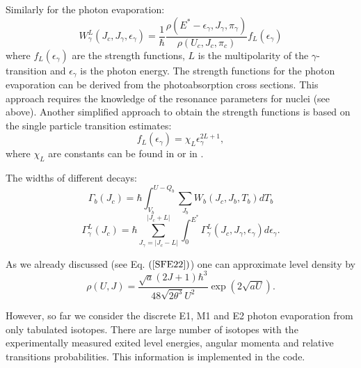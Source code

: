 Similarly for the photon evaporation:
\begin{equation}
\label{SPE3}W_\gamma ^L(J_c,J_{\gamma}, \epsilon_{\gamma})=
\frac 1\hbar\frac{\rho (E^{*}-\epsilon_{\gamma},J_{\gamma},\pi_{\gamma})}{\rho
(U_c,J_c,\pi_c)}f_L(\epsilon _\gamma ) 
\end{equation}
where $f_L(\epsilon _\gamma )$ are the strength functions, 
 $L$ is the multipolarity of the $\gamma$-transition and 
$\epsilon _{\gamma}$ is the photon energy. 
The strength functions for the photon evaporation 
can be derived from the photoabsorption cross 
sections. This approach requires the knowledge of the resonance 
parameters for nuclei (see above). Another simplified 
approach to obtain the strength 
functions is based on the single particle transition estimates:
\begin{equation}
\label{SPE4}f_L(\epsilon _\gamma )=\chi_{L}\epsilon_{\gamma}^{2L+1},
\end{equation}  
where  $\chi_{L}$ are constants can be found in 
 \cite{Wilkinson60} or in  \cite{Endt81}.
 
The widths of different decays:
\begin{equation}
\label{SPE4}\Gamma_b (J_c)=\hbar\int_{V_b}^{U-Q_b}\sum_{J_b}
W_b (J_c,J_b,T_b)dT_b
\end{equation}
\begin{equation}
\label{SPE5}\Gamma _{\gamma}
^L(J_c)=\hbar
\sum_{J_{\gamma}=|J_c-L|}^{|J_c+L|}\int_0^{E^{*}}
\Gamma_\gamma ^L(J_c,J_{\gamma}, \epsilon_{\gamma})d\epsilon _{\gamma}. 
\end{equation}

As we already discussed (see Eq. $(\ref{SFE22})$) 
one can approximate level density by 
\begin{equation}
\label{SPE6}\rho (U,J)=\frac{\sqrt{a}(2J+1)\hbar^3}{48\sqrt{2\theta ^3}U^2}\exp (2 
\sqrt{aU}). 
\end{equation}

However, so far we consider the discrete E1, M1 and E2 photon evaporation 
from only tabulated isotopes. 
There are large number of isotopes  \cite{ENSDF} with the experimentally
 measured exited level energies, angular momenta and relative transitions 
 probabilities. This information is 
 implemented in the code.
